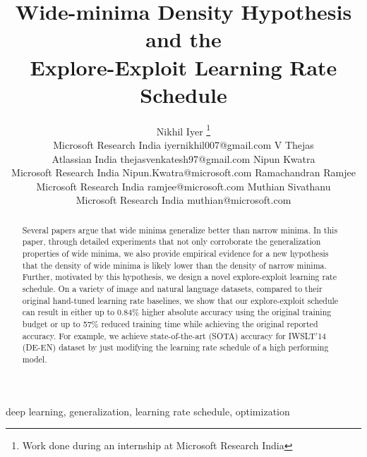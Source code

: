 \documentclass[twoside,11pt]{article}
\begin{document}
\title{Wide-minima Density Hypothesis and the \\Explore-Exploit Learning Rate Schedule}

\author{\name Nikhil Iyer  
     \thanks{Work done during an internship at Microsoft Research India} \\
       \addr Microsoft Research India
       \email iyernikhil007@gmail.com
       \AND
       \name V Thejas \footnotemark[1] \\
       \addr Atlassian India
       \email thejasvenkatesh97@gmail.com 
       \AND
       \name Nipun Kwatra \\ 
       \addr Microsoft Research India
       \email Nipun.Kwatra@microsoft.com
       \AND 
       \name Ramachandran Ramjee \\ 
       \addr Microsoft Research India
       \email ramjee@microsoft.com
       \AND 
       \name Muthian Sivathanu \\
       \addr Microsoft Research India
       \email muthian@microsoft.com}

\editor{}

\maketitle


\begin{abstract}

Several papers argue that wide minima generalize better than narrow minima. In this paper, through detailed experiments that not only corroborate the generalization properties of wide minima, we also
provide empirical evidence for a new hypothesis that the density of wide minima is likely lower than the density of narrow minima.
Further, motivated by this hypothesis, we design a novel explore-exploit learning rate schedule. On a variety of image and natural language datasets, compared to their original hand-tuned learning rate baselines, we show that our explore-exploit schedule can result in either up to 0.84\% higher absolute accuracy using the original training budget or up to 57\% reduced training time while achieving the original reported accuracy. For example, we achieve state-of-the-art (SOTA) accuracy for IWSLT'14 (DE-EN) dataset by just modifying the learning rate schedule of a high performing model.





\end{abstract} \begin{keywords}
  deep learning, generalization, learning rate schedule, optimization
\end{keywords}
\end{document}

